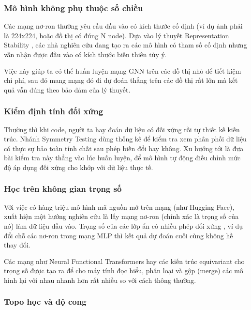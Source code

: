 \subsubsection{Mô hình không phụ thuộc số chiều }

Các mạng nơ-ron thường yêu cầu đầu vào có kích thước cố định (ví dụ ảnh phải là 224x224, hoặc đồ thị có đúng N node). Dựa vào lý thuyết Representation Stability \cite{farb2014representation}, các nhà nghiên cứu đang tạo ra các mô hình có tham số cố định nhưng vẫn nhận được đầu vào có kích thước biến thiên tùy ý. 

Việc này giúp ta có thể huấn luyện mạng GNN trên các đồ thị nhỏ để tiết kiệm chi phí, sau đó mang mạng đó đi dự đoán thẳng trên các đồ thị rất lớn mà kết quả vẫn đúng theo bảo đảm của lý thuyết.

\subsubsection{Kiểm định tính đối xứng}

Thường thì khi code, người ta hay đoán dữ liệu có đối xứng rồi tự thiết kế kiến trúc. Nhánh Symmetry Testing \cite{soleymani2025symmetrytesting} dùng thống kê để kiểm tra xem phân phối dữ liệu có thực sự bảo toàn tính chất sau phép biến đổi hay không. Xu hướng tới là đưa bài kiểm tra này thẳng vào lúc huấn luyện, để mô hình tự động điều chỉnh mức độ áp dụng đối xứng cho khớp với dữ liệu thực tế.

\subsubsection{Học trên không gian trọng số }

Với việc có hàng triệu mô hình mã nguồn mở trên mạng (như Hugging Face), xuất hiện một hướng nghiên cứu là lấy mạng nơ-ron (chính xác là trọng số của nó) làm dữ liệu đầu vào. Trọng số của các lớp ẩn có nhiều phép đối xứng \cite{zhao2026symmetry}, ví dụ đổi chỗ các nơ-ron trong mạng MLP thì kết quả dự đoán cuối cùng không hề thay đổi. 

Các mạng như Neural Functional Transformers \cite{zhou2024neural} hay các kiến trúc equivariant cho trọng số \cite{navon2023equivariant} được tạo ra để cho máy tính đọc hiểu, phân loại và gộp (merge) các mô hình lại với nhau nhanh hơn rất nhiều so với cách thông thường.

\subsubsection{Topo học và độ cong}

